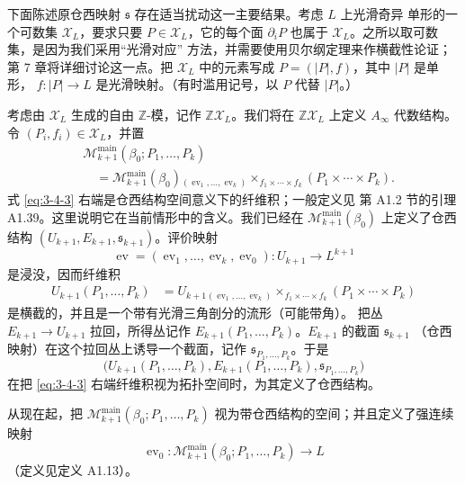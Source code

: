 下面陈述原仓西映射 $\mathfrak s$ 存在适当扰动这一主要结果。考虑 $L$ 上光滑奇异
单形的一个可数集 $\mathcal X_L$，要求只要 $P\in\mathcal X_L$，它的每个面
$\partial_iP$ 也属于 $\mathcal X_L$。之所以取可数集，是因为我们采用“光滑对应”
方法，并需要使用贝尔纲定理来作横截性论证；第 7 章将详细讨论这一点。把
$\mathcal X_L$ 中的元素写成 $P=(|P|,f)$，其中 $|P|$ 是单形，
$f\colon|P|\to L$ 是光滑映射。（有时滥用记号，以 $P$ 代替 $|P|$。）

考虑由 $\mathcal X_L$ 生成的自由 $\mathbb Z$-模，记作
$\mathbb Z\mathcal X_L$。我们将在 $\mathbb Z\mathcal X_L$ 上定义
$A_\infty$ 代数结构。令 $(P_i,f_i)\in\mathcal X_L$，并置
\begin{equation}
\begin{aligned}
 &\mathcal M_{k+1}^{\mathrm{main}}
   (\beta_0;P_1,\ldots,P_k)\\
 &\quad={}
 \mathcal M_{k+1}^{\mathrm{main}}(\beta_0)
 {}_{(\operatorname{ev}_1,\ldots,\operatorname{ev}_k)}
 \mathop{\times}_{f_1\times\cdots\times f_k}
 (P_1\times\cdots\times P_k).
\end{aligned}
\tag{3.4.3}\label{eq:3-4-3}
\end{equation}
式 \eqref{eq:3-4-3} 右端是仓西结构空间意义下的纤维积；一般定义见
第 A1.2 节的引理 A1.39。这里说明它在当前情形中的含义。我们已经在
$\mathcal M_{k+1}^{\mathrm{main}}(\beta_0)$ 上定义了仓西结构
$(U_{k+1},E_{k+1},\mathfrak s_{k+1})$。评价映射
\[
  \operatorname{ev}=(\operatorname{ev}_1,\ldots,\operatorname{ev}_k,
  \operatorname{ev}_0)\colon U_{k+1}\longrightarrow L^{k+1}
\]
是浸没，因而纤维积
\begin{equation}
\begin{aligned}
 U_{k+1}(P_1,\ldots,P_k)
 &={}
 U_{k+1}
 {}_{(\operatorname{ev}_1,\ldots,\operatorname{ev}_k)}
 \mathop{\times}_{f_1\times\cdots\times f_k}
 (P_1\times\cdots\times P_k)
\end{aligned}
\tag{3.4.4}\label{eq:3-4-4}
\end{equation}
是横截的，并且是一个带有光滑三角剖分的流形（可能带角）。
把丛 $E_{k+1}\to U_{k+1}$ 拉回，所得丛记作
$E_{k+1}(P_1,\ldots,P_k)$。$E_{k+1}$ 的截面 $\mathfrak s_{k+1}$
（仓西映射）在这个拉回丛上诱导一个截面，记作
$\mathfrak s_{P_1,\ldots,P_k}$。于是
\[
  \bigl(U_{k+1}(P_1,\ldots,P_k),
  E_{k+1}(P_1,\ldots,P_k),
  \mathfrak s_{P_1,\ldots,P_k}\bigr)
\]
在把 \eqref{eq:3-4-3} 右端纤维积视为拓扑空间时，为其定义了仓西结构。

从现在起，把 $\mathcal M_{k+1}^{\mathrm{main}}
(\beta_0;P_1,\ldots,P_k)$ 视为带仓西结构的空间；并且定义了强连续映射
\[
  \operatorname{ev}_0\colon
  \mathcal M_{k+1}^{\mathrm{main}}(\beta_0;P_1,\ldots,P_k)
  \longrightarrow L
\]
（定义见定义 A1.13）。

